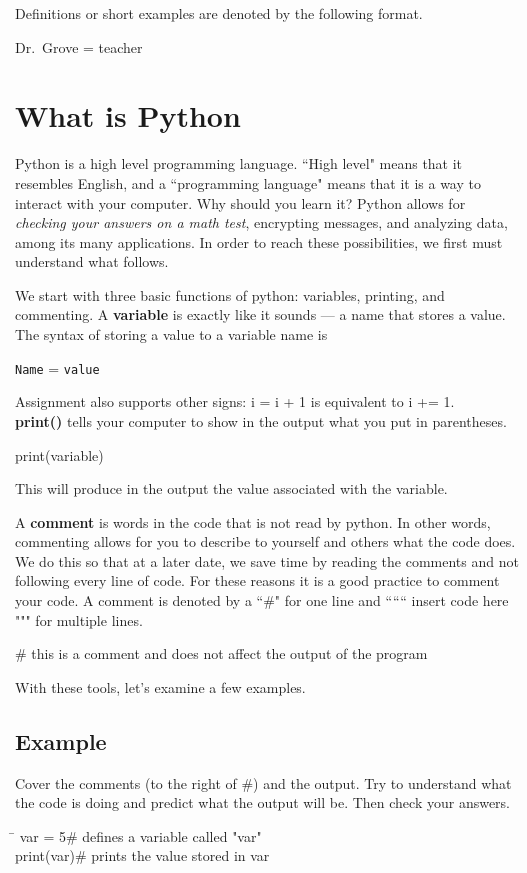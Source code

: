 \documentclass{article}
\newcommand{\define}[1]{\begin{center}\ttfamily #1\end{center}}
\newcommand{\icode}[1]{{\ttfamily #1}}
\begin{document}
\noindent Definitions or short examples are denoted by the following format.
\begin{center}
	\ttfamily Dr.~Grove = teacher
\end{center}
\section{What is Python}
Python is a high level programming language. ``High level" means that it resembles English, and a ``programming language" means that it is a way to interact with your computer. Why should you learn it? Python allows for \textit{checking your answers on a math test}, encrypting messages, and analyzing data, among its many applications. In order to reach these possibilities, we first must understand what follows.

We start with three basic functions of python: variables, printing, and commenting.
A \textbf{variable} is exactly like it sounds --- a name that stores a value. The syntax of storing a value to a variable name is 
\begin{center}
	\texttt{Name} = \texttt{value}
\end{center}
Assignment also supports other signs: \icode{i = i + 1} is equivalent to \icode{i += 1}.\\
\textbf{print()} tells your computer to show in the output what you put in parentheses.
\begin{center}
	\ttfamily print(variable)
\end{center}
This will produce in the output the value associated with the variable.

A \textbf{comment} is words in the code that is not read by python. In other words, commenting allows for you to describe to yourself and others what the code does. We do this so that at a later date, we save time by reading the comments and not following every line of code. For these reasons it is a good practice to comment your code. A comment is denoted by a ``\#" for one line and `````` insert code here """ for multiple lines.
\define{\# this is a comment and does not affect the output of the program}
\noindent With these tools, let's examine a few examples. 

\subsection{Example}
Cover the comments (to the right of \#) and the output. Try to understand what the code is doing and predict what the output will be. Then check your answers.
\vspace{1 mm}
\begin{tcolorbox}
	\ttfamily
	\begin{tabbing}
		\hspace{3.25 in}\=\hspace{3.25 in} \kill
		var = 5\>\# defines a variable called "var"\\
		print(var)\>\# prints the value stored in var
	\end{tabbing}
\end{tcolorbox}
\begin{tcolorbox}[colback=output]
\end{tcolorbox}
\end{document}
